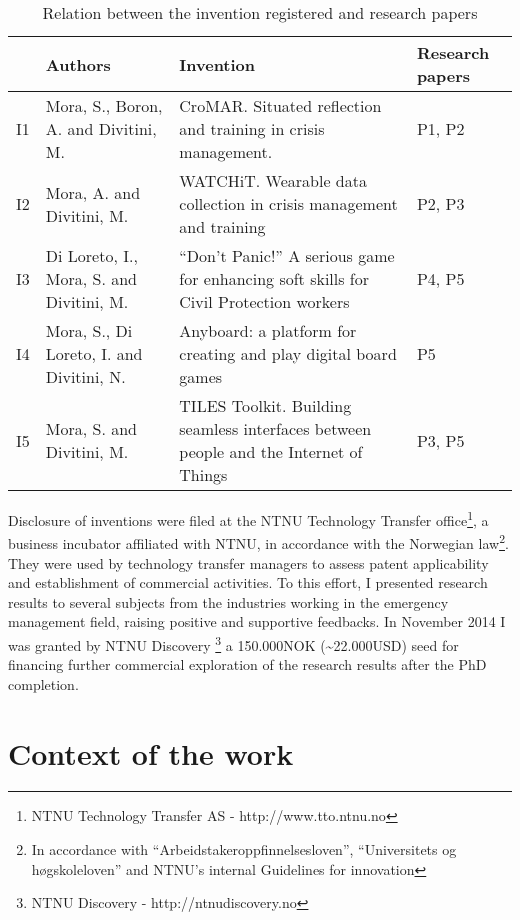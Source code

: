 \begin{table}[tbh]
    \centering
    \caption{Relation between the invention registered and research papers}
    \label{tab:papers-inventions}
\begin{tabular}{p{}p{}p{}p{}}
\toprule
  & Authors    & Invention  &  Research papers  \\ \midrule
I1 & Mora, S., Boron, A. and Divitini, M.   & CroMAR. Situated reflection and training in crisis management.   & P1, P2    \\ \noalign{\smallskip}
I2 & Mora, A. and Divitini, M. & WATCHiT. Wearable data collection in crisis management and training & P2, P3 \\ \noalign{\smallskip}
I3 & Di Loreto, I., Mora, S. and Divitini, M. & “Don’t Panic!” A serious game for enhancing soft skills for Civil Protection workers & P4, P5 \\ \noalign{\smallskip}
I4 & Mora, S., Di Loreto, I. and Divitini, N. & Anyboard: a platform for creating and play digital board games & P5 \\ \noalign{\smallskip}
I5 & Mora, S. and Divitini, M. & TILES Toolkit. Building seamless interfaces between people and the Internet of Things & P3, P5 \\
\bottomrule
\end{tabular}
\end{table}

Disclosure of inventions were filed at the NTNU Technology Transfer
office\footnote{NTNU Technology Transfer AS - http://www.tto.ntnu.no}, a
business incubator affiliated with NTNU, in accordance with the
Norwegian law\footnote{In accordance with
  ``Arbeidstakeroppfinnelsesloven'', ``Universitets og høgskoleloven''
  and NTNU's internal Guidelines for innovation}. They were used by
technology transfer managers to assess patent applicability and
establishment of commercial activities. To this effort, I presented
research results to several subjects from the industries working in the
emergency management field, raising positive and supportive feedbacks.
In November 2014 I was granted by NTNU Discovery \footnote{NTNU
  Discovery - http://ntnudiscovery.no} a 150.000NOK
(\textasciitilde{}22.000USD) seed for financing further commercial
exploration of the research results after the PhD completion.

\section{Context of the work}\label{context-of-the-work}

